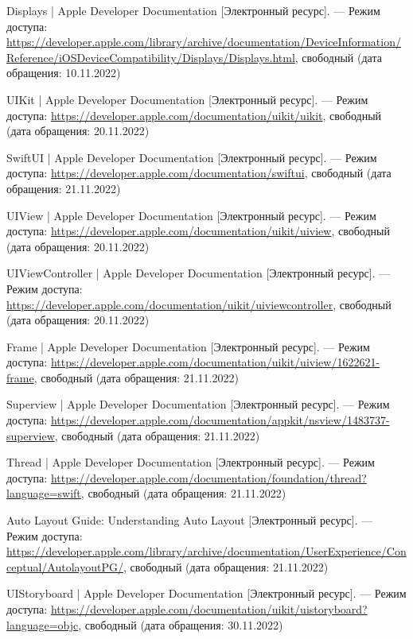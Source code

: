 \begin{thebibliography}{}
	Displays | Apple Developer Documentation [Электронный ресурс]. --- Режим доступа: \url{https://developer.apple.com/library/archive/documentation/DeviceInformation/Reference/iOSDeviceCompatibility/Displays/Displays.html}, свободный (дата обращения: 10.11.2022)
	
	UIKit | Apple Developer Documentation [Электронный ресурс]. --- Режим доступа: \url{https://developer.apple.com/documentation/uikit/uikit}, свободный (дата обращения: 20.11.2022)
	
	SwiftUI | Apple Developer Documentation [Электронный ресурс]. --- Режим доступа: \url{https://developer.apple.com/documentation/swiftui}, свободный (дата обращения: 21.11.2022)
	
	UIView | Apple Developer Documentation [Электронный ресурс]. --- Режим доступа: \url{https://developer.apple.com/documentation/uikit/uiview}, свободный (дата обращения: 20.11.2022)
	
	UIViewController | Apple Developer Documentation [Электронный ресурс]. --- Режим доступа: \url{https://developer.apple.com/documentation/uikit/uiviewcontroller}, свободный (дата обращения: 20.11.2022)
	
	Frame | Apple Developer Documentation [Электронный ресурс]. --- Режим доступа: \url{https://developer.apple.com/documentation/uikit/uiview/1622621-frame}, свободный (дата обращения: 21.11.2022)
	
	Superview | Apple Developer Documentation [Электронный ресурс]. --- Режим доступа: \url{https://developer.apple.com/documentation/appkit/nsview/1483737-superview}, свободный (дата обращения: 21.11.2022)
	
	Thread | Apple Developer Documentation [Электронный ресурс]. --- Режим доступа: \url{https://developer.apple.com/documentation/foundation/thread?language=swift}, свободный (дата обращения: 21.11.2022)
	
	Auto Layout Guide: Understanding Auto Layout [Электронный ресурс]. --- Режим доступа: \url{https://developer.apple.com/library/archive/documentation/UserExperience/Conceptual/AutolayoutPG/}, свободный (дата обращения: 21.11.2022)
	
	UIStoryboard | Apple Developer Documentation [Электронный ресурс]. --- Режим доступа: \url{https://developer.apple.com/documentation/uikit/uistoryboard?language=objc}, свободный (дата обращения: 30.11.2022)
	

\end{thebibliography}
